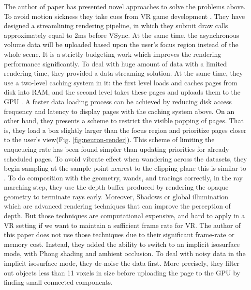 \documentclass[10pt,twocolumn,letterpaper]{article}
\begin{document}
The author of paper \cite{Usher2018} has presented novel approaches to solve the problems above. To avoid motion sickness they take cues from VR game development \cite{Vlachos2015}. They have designed a streamlining rendering pipeline, in which they submit draw calls approximately equal to 2ms before VSync. At the same time, the asynchronous volume data will be uploaded based upon the user’s focus region instead of the whole scene. It is a strictly budgeting work which improves the rendering performance significantly. To deal with huge amount of data with a limited rendering time, they provided a data streaming solution. At the same time, they use a two-level caching system in it: the first level loads and caches pages from disk into RAM, and the second level takes these pages and uploads them to the GPU \cite{Baker:1977} . A faster data loading process can be achieved by reducing disk access frequency and latency to display pages with the caching system above. On an other hand, they presents a scheme to restrict the visible popping of pages. That is, they load a box slightly larger than the focus region and prioritize pages closer to the user’s view(Fig. \ref{fig:neuron-render}). This scheme of limiting the enqueueing rate has been found simpler than updating priorities for already scheduled pages. To avoid vibrate effect when wandering across the datasets, they begin sampling at the sample point nearest to the clipping plane this is similar to \cite{291532}. To do composition with the geometry, wands, and tracings correctly, in the ray marching step, they use the depth buffer produced by rendering the opaque geometry to terminate rays early. Moreover, Shadows or global illumination which are advanced rendering techniques that can improve the perception of depth. But those techniques are computational expensive, and hard to apply in a VR setting if we want to maintain a sufficient frame rate for VR. The author of this paper does not use those techniques due to their significant frame-rate or memory cost. Instead, they added the ability to switch to an implicit isosurface mode, with Phong shading and ambient occlusion. To deal with noisy data in the implicit isosurface mode, they de-noise the data first. More precisely, they filter out objects less than 11 voxels in size before uploading the page to the GPU by finding small connected components.
\end{document}
